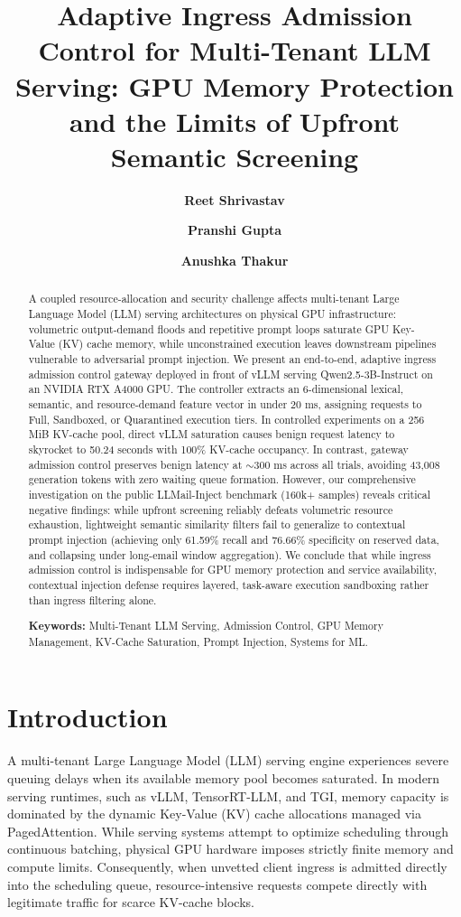 \documentclass[runningheads]{article}
\title{\textbf{Adaptive Ingress Admission Control for Multi-Tenant LLM Serving: GPU Memory Protection and the Limits of Upfront Semantic Screening}}
\author[1]{\textbf{Reet Shrivastav}}
\author[1]{\textbf{Pranshi Gupta}}
\author[1]{\textbf{Anushka Thakur}}
\affil[1]{Department of Computer Science and Engineering}
\affil[ ]{\texttt{\{shrivastavreet03, pranshigupta, anushkathakur\}@example.com}}
\date{}
\begin{document}
\maketitle

\begin{abstract}
A coupled resource-allocation and security challenge affects multi-tenant Large Language Model (LLM) serving architectures on physical GPU infrastructure: volumetric output-demand floods and repetitive prompt loops saturate GPU Key-Value (KV) cache memory, while unconstrained execution leaves downstream pipelines vulnerable to adversarial prompt injection. We present an end-to-end, adaptive ingress admission control gateway deployed in front of vLLM serving Qwen2.5-3B-Instruct on an NVIDIA RTX A4000 GPU. The controller extracts an 6-dimensional lexical, semantic, and resource-demand feature vector in under 20 ms, assigning requests to Full, Sandboxed, or Quarantined execution tiers. In controlled experiments on a 256 MiB KV-cache pool, direct vLLM saturation causes benign request latency to skyrocket to 50.24 seconds with 100\% KV-cache occupancy. In contrast, gateway admission control preserves benign latency at $\sim$300 ms across all trials, avoiding 43,008 generation tokens with zero waiting queue formation. However, our comprehensive investigation on the public LLMail-Inject benchmark (160k+ samples) reveals critical negative findings: while upfront screening reliably defeats volumetric resource exhaustion, lightweight semantic similarity filters fail to generalize to contextual prompt injection (achieving only 61.59\% recall and 76.66\% specificity on reserved data, and collapsing under long-email window aggregation). We conclude that while ingress admission control is indispensable for GPU memory protection and service availability, contextual injection defense requires layered, task-aware execution sandboxing rather than ingress filtering alone.

\vspace{0.8em}
\noindent\textbf{Keywords:} Multi-Tenant LLM Serving, Admission Control, GPU Memory Management, KV-Cache Saturation, Prompt Injection, Systems for ML.
\end{abstract}

\section{Introduction}

A multi-tenant Large Language Model (LLM) serving engine experiences severe queuing delays when its available memory pool becomes saturated. In modern serving runtimes, such as vLLM, TensorRT-LLM, and TGI, memory capacity is dominated by the dynamic Key-Value (KV) cache allocations managed via PagedAttention. While serving systems attempt to optimize scheduling through continuous batching, physical GPU hardware imposes strictly finite memory and compute limits. Consequently, when unvetted client ingress is admitted directly into the scheduling queue, resource-intensive requests compete directly with legitimate traffic for scarce KV-cache blocks.
\end{document}
